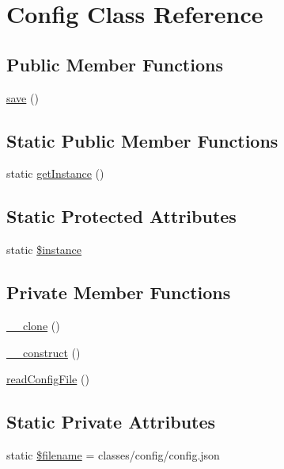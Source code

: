 \hypertarget{class_config}{}\section{Config Class Reference}
\label{class_config}
\subsection*{Public Member Functions}
\begin{DoxyCompactItemize}
\item 
\hyperlink{class_config_afc8a3c62679cf00ade9f15fb2a6d6132}{save} ()
\end{DoxyCompactItemize}
\subsection*{Static Public Member Functions}
\begin{DoxyCompactItemize}
\item 
static \hyperlink{class_config_ac93fbec81f07e5d15f80db907e63dc10}{get\+Instance} ()
\end{DoxyCompactItemize}
\subsection*{Static Protected Attributes}
\begin{DoxyCompactItemize}
\item 
static \hyperlink{class_config_ad9d7ce33ebb142b70e58b68052ca0ea8}{\$instance}
\end{DoxyCompactItemize}
\subsection*{Private Member Functions}
\begin{DoxyCompactItemize}
\item 
\hyperlink{class_config_ad0cb87b388bc74d63dc884accdca8713}{\+\_\+\+\_\+clone} ()
\item 
\hyperlink{class_config_a095c5d389db211932136b53f25f39685}{\+\_\+\+\_\+construct} ()
\item 
\hyperlink{class_config_a55c3dd2c0ad1c883a3fc76a679eabbe9}{read\+Config\+File} ()
\end{DoxyCompactItemize}
\subsection*{Static Private Attributes}
\begin{DoxyCompactItemize}
\item 
static \hyperlink{class_config_a0722441477f957078ee2437054556cbc}{\$filename} = \textquotesingle{}classes/config/config.\+json\textquotesingle{}
\end{DoxyCompactItemize}


